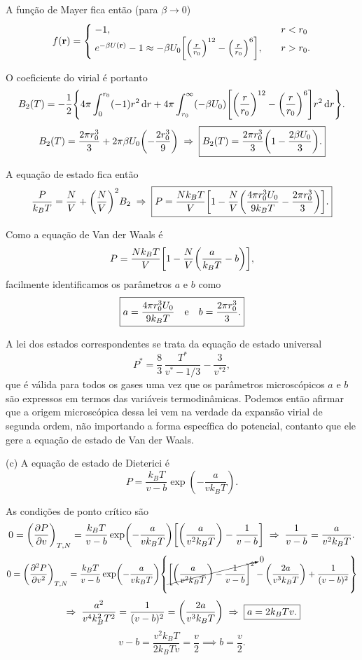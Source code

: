 \documentclass[a4paper,10pt]{article}
\begin{document}
A função de Mayer fica então (para $\beta \to 0$)
\begin{align*}
f(\vb{r}) =
\begin{cases}
\; -1, \quad & r < r_0 \\
\; e^{-\beta U(\vb{r})} - 1 \approx - \beta U_0 \qty[\qty(\frac{r}{r_0})^{12} - \qty(\frac{r}{r_0})^6],
\quad & r > r_0.
\end{cases}
\end{align*}

O coeficiente do virial é portanto
$$
B_2(T) = - \frac{1}{2} \qty{4\pi \int_0^{r_0} (-1) r^2 \dd{r} +
4\pi \int_{r_0}^\infty (-\beta U_0) \qty[\qty(\frac{r}{r_0})^{12} - \qty(\frac{r}{r_0})^6] r^2 \dd{r} } .
$$
$$
B_2(T) = \frac{2\pi r_0^3}{3} + 2\pi \beta U_0 \qty(-\frac{2 r_0^3}{9}) \; \Rightarrow \;
\boxed{ B_2(T) = \frac{2\pi r_0^3}{3} \qty(1 - \frac{2\beta U_0}{3}). }
$$

A equação de estado fica então
$$
\frac{P}{k_B T} = \frac{N}{V} + \qty(\frac{N}{V})^2 B_2 \; \Rightarrow \;
\boxed{
P =
\frac{N k_B T}{V} \qty[1 - \frac{N}{V} \qty(\frac{4 \pi r_0^3 U_0}{9 k_B T} - \frac{2\pi r_0^3}{3})]. }
$$

Como a equação de Van der Waals é
$$
P =
\frac{N k_B T}{V} \qty[1 - \frac{N}{V} \qty(\frac{a}{k_B T} - b)],
$$
facilmente identificamos os parâmetros $a$ e $b$ como
$$
\boxed{ a = \frac{4 \pi r_0^3 U_0}{9 k_B T} \quad \mathrm{e} \quad b = \frac{2\pi r_0^3}{3}. }
$$

A lei dos estados correspondentes se trata da equação de estado universal
$$
P^* = \frac{8}{3} \, \frac{T^*}{v^* - 1/3} - \frac{3}{v^{*2}},
$$
que é válida para todos os gases uma vez que os parâmetros microscópicos $a$ e $b$ são expressos em termos das variáveis termodinâmicas. Podemos então afirmar que a origem microscópica dessa lei vem na verdade da expansão virial de segunda ordem, não importando a forma específica do potencial, contanto que ele gere a equação de estado de Van der Waals.

\n\n

(c) A equação de estado de Dieterici é
$$
P = \frac{k_B T}{v-b} \exp(-\frac{a}{v k_B T}).
$$

As condições de ponto crítico são
$$
0 = \qty(\pdv{P}{v})_{T,N} = \frac{k_B T}{v-b} \exp(-\frac{a}{v k_B T}) \qty[
\qty(\frac{a}{v^2 k_B T})
- \frac{1}{v-b} ] \; \Rightarrow \;
\frac{1}{v-b} = \frac{a}{v^2 k_B T}.
$$
$$
0 = \qty(\pdv[2]{P}{v})_{T,N} =
\frac{k_B T}{v-b} \exp(-\frac{a}{v k_B T}) \qty{ \cancelto{0}{\qty[
\qty(\frac{a}{v^2 k_B T})
- \frac{1}{v-b} ]^2}
-\qty(\frac{2a}{v^3 k_B T})
+ \frac{1}{(v-b)^2}
}
$$
$$
\; \Rightarrow \;
\frac{a^2}{v^4 k_B^2 T^2} = \frac{1}{(v-b)^2} = \qty(\frac{2a}{v^3 k_B T}) \; \Rightarrow \;
\boxed{ a = 2 k_B T v. }
$$
$$
v-b = \frac{v^2 k_B T}{2 k_B T v} = \frac{v}{2} \implies \boxed{b = \frac{v}{2}. }
$$
\end{document}
